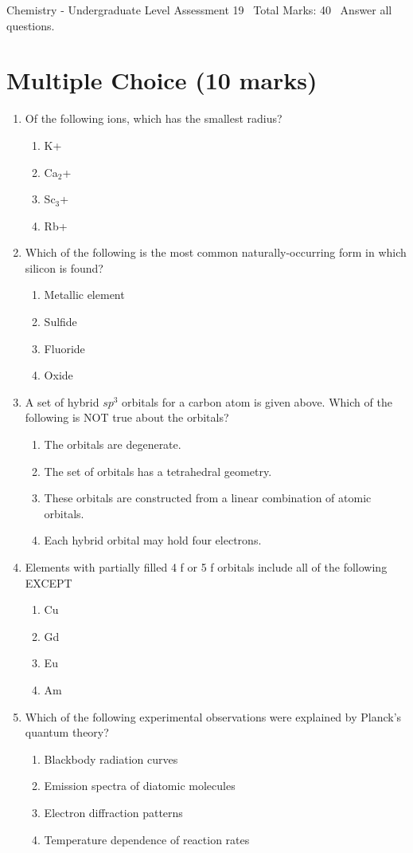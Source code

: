 \documentclass[12pt]{article}
\begin{document}
\begin{center}
Chemistry - Undergraduate Level Assessment 19 \
Total Marks: 40 \
Answer all questions.
\end{center}

\section*{Multiple Choice (10 marks)}
\begin{enumerate}[label=\arabic*.]
\item Of the following ions, which has the smallest radius?
\begin{enumerate}[label=(\alph*)]
    \item K+
    \item Ca$_{2}$+
    \item Sc$_{3}$+
    \item Rb+
\end{enumerate}
\item Which of the following is the most common naturally-occurring form in which silicon is found?
\begin{enumerate}[label=(\alph*)]
    \item Metallic element
    \item Sulfide
    \item Fluoride
    \item Oxide
\end{enumerate}
\item A set of hybrid $sp^3$ orbitals for a carbon atom is given above. Which of the following is NOT true about the orbitals?
\begin{enumerate}[label=(\alph*)]
    \item The orbitals are degenerate.
    \item The set of orbitals has a tetrahedral geometry.
    \item These orbitals are constructed from a linear combination of atomic orbitals.
    \item Each hybrid orbital may hold four electrons.
\end{enumerate}
\item Elements with partially filled 4 f or 5 f orbitals include all of the following EXCEPT
\begin{enumerate}[label=(\alph*)]
    \item Cu
    \item Gd
    \item Eu
    \item Am
\end{enumerate}
\item Which of the following experimental observations were explained by Planck's quantum theory?
\begin{enumerate}[label=(\alph*)]
    \item Blackbody radiation curves
    \item Emission spectra of diatomic molecules
    \item Electron diffraction patterns
    \item Temperature dependence of reaction rates
\end{enumerate}
\end{enumerate}
\end{document}
